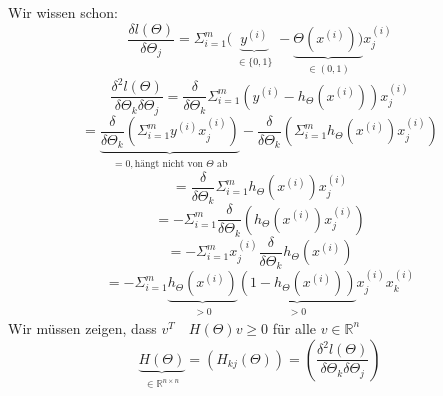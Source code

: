 \begin{enumerate}[(1)]
Wir wissen schon: 
\[ \frac{\delta l(\Theta)}{\delta \Theta_j} = \Sigma^m_{i=1}(\underbrace{y^{(i)}}_{\substack{\in \{0,1\}}} - \underbrace{\Theta(x^{(i)}))}_{\substack{\in (0,1)}} x^{(i)}_j\]
\[ \frac{\delta^2 l(\Theta)}{\delta \Theta_k \delta \Theta_j} = \frac{\delta}{\delta \Theta_k }\Sigma^m_{i=1} (y^{(i)} - h_\Theta(x^{(i)})) x_j^{(i)}\]
\[ =\underbrace{\frac{\delta}{\delta \Theta_k} (\Sigma_{i=1}^m y^{(i)} x_j^{(i)})}_{\substack{= 0, \text{hängt nicht von $\Theta$ ab}}} - \frac{\delta}{\delta \Theta_k} (\Sigma^m_{i=1} h_\Theta(x^{(i)}) x_j^{(i)})\]
\[ = \frac{\delta}{\delta \Theta_k} \Sigma^m_{i=1} h_\Theta (x^{(i)}) x_j^{(i)}\]
\[ = - \Sigma^m_{i=1} \frac{\delta}{\delta \Theta_k} (h_\Theta(x^{(i)}) x_j^{(i)})\]
\[ = - \Sigma^m_{i=1} x_j^{(i)} \frac{\delta}{\delta\Theta_k} h_\Theta(x^{(i)})\]
\[ = - \Sigma^m_{i=1} \underbrace{h_\Theta(x^{(i)})}_{\substack{> 0}} \underbrace{(1- h_\Theta(x^{(i)}))}_{\substack{> 0}} x_j^{(i)} x_k^{(i)}\]
Wir müssen zeigen, dass $v^T \quad H(\Theta)v \geq 0$ für alle $v \in \mathbb{R}^n$
\[ \underbrace{H(\Theta)}_{\substack{\in \mathbb{R}^{n \times n}}} = (H_{kj}(\Theta)) = \left( \frac{\delta^2 l(\Theta)}{\delta\Theta_k \delta\Theta_j}\right)\]
\[\]

\end{enumerate}